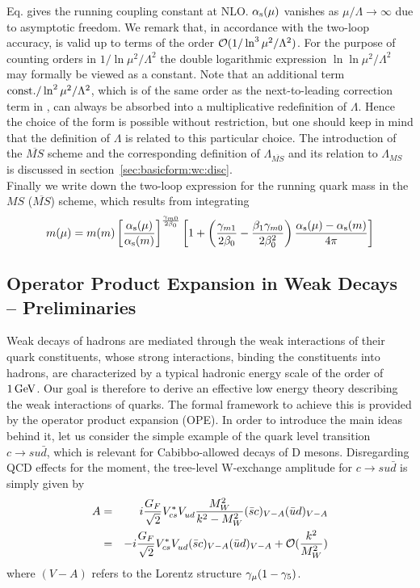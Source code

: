 Eq.  gives the running coupling constant at NLO. $\alpha_{\rm s}(\mu)$
vanishes as $\mu/\Lambda\to\infty$ due to asymptotic freedom. We
remark that, in accordance with the two-loop accuracy,  is
valid up to terms of the order ${\cal O}(1/\ln^3\mu^2/\Lambda^2)$.
For the purpose of counting orders in $1/\ln\mu^2/\Lambda^2$ the
double logarithmic expression $\ln\ln\mu^2/\Lambda^2$ may formally
be viewed as a constant. Note that an additional term
${\rm const.}/\ln^2\mu^2/\Lambda^2$, which is of the same order as
the next-to-leading correction term in , can always be
absorbed into a multiplicative redefinition of $\Lambda$. Hence the
choice of the form  is possible without restriction, but one
should keep in mind that the definition of $\Lambda$ is related to this
particular choice. The introduction of the $\overline{MS}$ scheme and
the corresponding definition of $\Lambda_{\overline{MS}}$ and its
relation to $\Lambda_{MS}$ is discussed in
section~\ref{sec:basicform:wc:disc}.
\\
Finally we write down the two-loop expression for the running quark
mass in the $MS$ ($\overline{MS}$) scheme, which results from
integrating 
\begin{equation}\label{mmu}
m(\mu)=m(m)\left[{\alpha_{\rm s}(\mu)\over\alpha_{\rm s}(m)}\right]^{\gamma_{m0}\over 2\beta_0}
\left[1+\left({\gamma_{m1}\over 2\beta_0}-{\beta_1\gamma_{m0}\over
  2\beta^2_0}\right){\alpha_{\rm s}(\mu)-\alpha_{\rm s}(m)\over 4\pi}\right]  \end{equation}

\subsection{Operator Product Expansion in Weak Decays -- Preliminaries}
            \label{sec:basicform:prelim}
Weak decays of hadrons are mediated through the weak interactions of
their quark constituents, whose strong interactions, binding the
constituents into hadrons, are characterized by a typical hadronic
energy scale of the order of $1\, {\rm GeV}$. Our goal is therefore to derive
an effective low energy theory describing the weak interactions of
quarks. The formal framework to achieve this is provided by the
operator product expansion (OPE). In order to introduce the main ideas
behind it, let us consider the simple example of
the quark level transition $c\to su\bar d$,
which is relevant for Cabibbo-allowed decays of D mesons.
Disregarding QCD effects for the moment, the tree-level W-exchange
amplitude for $c\to su\bar d$ is simply given by
\begin{eqnarray}\label{aope}
A&=&i{G_F\over\sqrt{2}}V^*_{cs}V_{ud}^{}{M^2_W\over k^2-M^2_W}
  (\bar sc)_{V-A}(\bar ud)_{V-A} \nonumber\\
 &=& -i{G_F\over\sqrt{2}}V^*_{cs}V_{ud}^{}
  (\bar sc)_{V-A}(\bar ud)_{V-A} + {\cal O}({k^2\over M^2_W})
\end{eqnarray}
where $(V-A)$ refers to the Lorentz structure $\gamma_{\mu} (1-\gamma_5)$.

